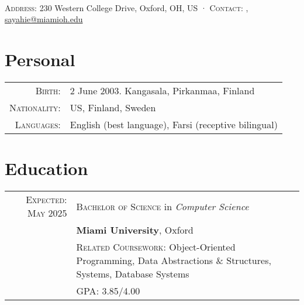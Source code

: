 \documentclass[letterpaper,10pt]{article} %
\begin{document}
\pagestyle{empty} %


\par{
{\\
\footnotesize{
\textsc{Address:} 230 Western College Drive, Oxford, OH, US
·
\textsc{Contact:} \href{tel:+1-513-484-0972}{\color{black}{+1 (513) 484-0972}}, \href{mailto:sayahie@miamioh.edu}{\color{black}sayahie@miamioh.edu}\\
}\normalsize
\bigskip\par} %

\section{Personal}

\footnotesize{\begin{tabular}{rl}
\textsc{Birth:} & 2 June 2003. Kangasala, Pirkanmaa, Finland \\
\textsc{Nationality:} & US, Finland, Sweden \\
\textsc{Languages:} & English (best language), Farsi (receptive bilingual)\\
\end{tabular}}\normalsize


\section{Education}

\begin{tabular}{rl}	
\textsc{Expected: May 2025} & \textsc{Bachelor of Science} in \emph{Computer Science}\\ &
\textbf{Miami University}, Oxford\\ &
\footnotesize \textsc{Related Coursework:} Object-Oriented Programming, Data Abstractions \& Structures, Systems, Database Systems\\&
\footnotesize \textsc{GPA}: 3.85/4.00\normalsize \\


\end{tabular}}
\end{document}
